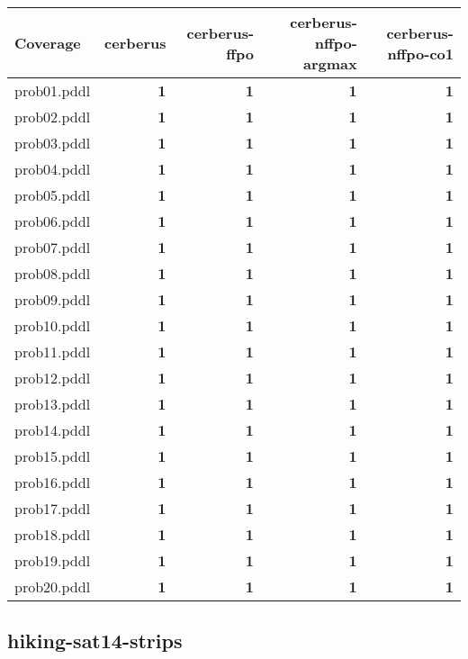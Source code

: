 \documentclass{article}
\begin{document}
\begin{tabular}{@{}lrrrr@{}}
Coverage & cerberus & cerberus-ffpo & cerberus-nffpo-argmax & cerberus-nffpo-co1 \\
\midrule
prob01.pddl & \textbf{1} & \textbf{1} & \textbf{1} & \textbf{1} \\
prob02.pddl & \textbf{1} & \textbf{1} & \textbf{1} & \textbf{1} \\
prob03.pddl & \textbf{1} & \textbf{1} & \textbf{1} & \textbf{1} \\
prob04.pddl & \textbf{1} & \textbf{1} & \textbf{1} & \textbf{1} \\
prob05.pddl & \textbf{1} & \textbf{1} & \textbf{1} & \textbf{1} \\
prob06.pddl & \textbf{1} & \textbf{1} & \textbf{1} & \textbf{1} \\
prob07.pddl & \textbf{1} & \textbf{1} & \textbf{1} & \textbf{1} \\
prob08.pddl & \textbf{1} & \textbf{1} & \textbf{1} & \textbf{1} \\
prob09.pddl & \textbf{1} & \textbf{1} & \textbf{1} & \textbf{1} \\
prob10.pddl & \textbf{1} & \textbf{1} & \textbf{1} & \textbf{1} \\
prob11.pddl & \textbf{1} & \textbf{1} & \textbf{1} & \textbf{1} \\
prob12.pddl & \textbf{1} & \textbf{1} & \textbf{1} & \textbf{1} \\
prob13.pddl & \textbf{1} & \textbf{1} & \textbf{1} & \textbf{1} \\
prob14.pddl & \textbf{1} & \textbf{1} & \textbf{1} & \textbf{1} \\
prob15.pddl & \textbf{1} & \textbf{1} & \textbf{1} & \textbf{1} \\
prob16.pddl & \textbf{1} & \textbf{1} & \textbf{1} & \textbf{1} \\
prob17.pddl & \textbf{1} & \textbf{1} & \textbf{1} & \textbf{1} \\
prob18.pddl & \textbf{1} & \textbf{1} & \textbf{1} & \textbf{1} \\
prob19.pddl & \textbf{1} & \textbf{1} & \textbf{1} & \textbf{1} \\
prob20.pddl & \textbf{1} & \textbf{1} & \textbf{1} & \textbf{1} \\
\end{tabular}

\hypertarget{coverage-hiking-sat14-strips}{}
\subsection*{hiking-sat14-strips}
\end{document}
